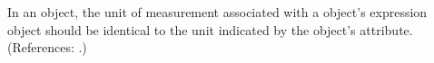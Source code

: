 In an \Event object, the unit of measurement associated with a \Delay
object's  expression object should be identical to the unit
indicated by the \Model object's  attribute.  (References:
.)
